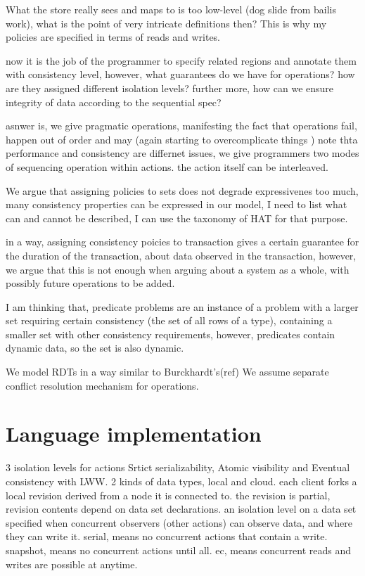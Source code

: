 \documentclass[preprint, numbers]{sigplanconf}
\begin{document}
What the store really sees and maps to is too low-level (dog slide from bailis
work), what is the point of very intricate definitions then? This is why my
policies are specified in terms of reads and writes.

now it is the job of the programmer to specify related regions and annotate them
with consistency level, however, what guarantees do we have for operations? how
are they assigned different isolation levels?
further more, how can we ensure integrity of data according to the sequential
spec?

asnwer is, we give pragmatic operations, manifesting the fact that operations
fail, happen out of order and may (again starting to overcomplicate things )
note thta performance and consistency are differnet issues, we give programmers
two modes of sequencing operation within actions. the action itself can be
interleaved. 

We argue that assigning policies to sets does not degrade expressivenes too
much, many consistency properties can be expressed in our model, I need to list
what can and cannot be described, I can use the taxonomy of HAT for that
purpose.

in a way, assigning consistency poicies to transaction gives a certain guarantee
for the duration of the transaction, about data observed in the transaction,
however, we argue that this is not enough when arguing about a system as a
whole, with possibly future operations to be added.

I am thinking that, predicate problems are an instance of a problem with a
larger set requiring certain consistency (the set of all rows of a type),
containing a smaller set with other consistency requirements, however,
predicates contain dynamic data, so the set is also dynamic.

We model RDTs in a way similar to Burckhardt's(ref)
We assume separate conflict resolution mechanism for operations.

\section{Language implementation}
3 isolation levels for actions Srtict serializability, Atomic visibility and
Eventual consistency with LWW. 
2 kinds of data types, local and cloud.
each client forks a local revision derived from a node it is connected to.
the revision is partial, revision contents depend on data set declarations.
an isolation level on a data set specified when concurrent observers (other actions)
can observe data, and where they can write it.
serial, means no concurrent actions that contain a write.
snapshot, means no concurrent actions until all.
ec, means concurrent reads and writes are possible at anytime.
\end{document}
